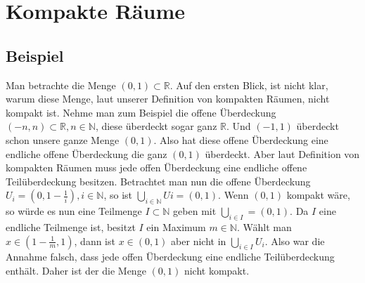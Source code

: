 \chapter{Kompakte Räume}

	\section{Beispiel}
		Man betrachte die Menge \( (0,1) \subset \mathbb{R} \). Auf den ersten Blick, ist nicht klar, warum diese Menge, laut unserer Definition von kompakten Räumen, nicht kompakt ist. 
		Nehme man zum Beispiel die offene Überdeckung \( (-n,n) \subset \mathbb{R} , n \in \mathbb{N} \), diese überdeckt sogar ganz \(  \mathbb{R} \). 
		Und \( (-1,1)  \) überdeckt schon unsere ganze Menge \( (0,1)  \). Also hat diese offene Überdeckung eine endliche offene Überdeckung die ganz \( (0,1)  \) überdeckt.
		Aber laut Definition von kompakten Räumen muss jede offen Überdeckung eine endliche offene Teilüberdeckung besitzen. Betrachtet man nun die offene Überdeckung 
		\( U_{i}=(0,1-\frac{1}{i}), i \in \mathbb{N} \), so ist \(\bigcup_{i \in \mathbb{N}} U{i} = (0,1) \). Wenn \( (0,1)  \) kompakt wäre, 
		so würde es nun eine Teilmenge \(I \subset \mathbb{N} \) geben mit \(\bigcup_{i \in I} = (0,1) \).
		Da \(I\) eine endliche Teilmenge ist, besitzt \(I\) ein Maximum \( m \in \mathbb{N} \). Wählt man \(x \in (1-\frac{1}{m},1) \), dann ist \(x \in (0,1) \) aber nicht 
		in \(\bigcup_{i \in I} U_{i}\). Also war die Annahme falsch, dass jede offen Überdeckung eine endliche Teilüberdeckung enthält. Daher ist der die Menge \((0,1) \) nicht kompakt.
		
		